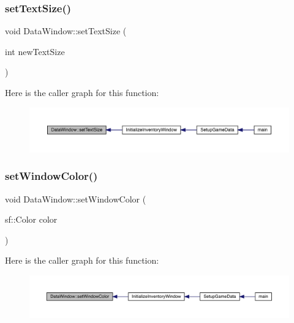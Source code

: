 \subsubsection{\texorpdfstring{set\+Text\+Size()}{setTextSize()}}
{\footnotesize\ttfamily void Data\+Window\+::set\+Text\+Size (\begin{DoxyParamCaption}\item[{int}]{new\+Text\+Size }\end{DoxyParamCaption})}

Here is the caller graph for this function\+:
\nopagebreak
\begin{figure}[H]
\begin{center}
\leavevmode
\includegraphics[width=350pt]{d1/def/class_data_window_aa9fe53356b3989e0781a13a03814aaac_icgraph}
\end{center}
\end{figure}
\mbox{\label{class_data_window_ab06d2ddf751a472f8f2305084f572a4b}} 
\subsubsection{\texorpdfstring{set\+Window\+Color()}{setWindowColor()}}
{\footnotesize\ttfamily void Data\+Window\+::set\+Window\+Color (\begin{DoxyParamCaption}\item[{sf\+::\+Color}]{color }\end{DoxyParamCaption})}

Here is the caller graph for this function\+:
\nopagebreak
\begin{figure}[H]
\begin{center}
\leavevmode
\includegraphics[width=350pt]{d1/def/class_data_window_ab06d2ddf751a472f8f2305084f572a4b_icgraph}
\end{center}
\end{figure}
\mbox{\label{class_data_window_ab28e270817e9cdc56c78d9723c485d8f}} 
